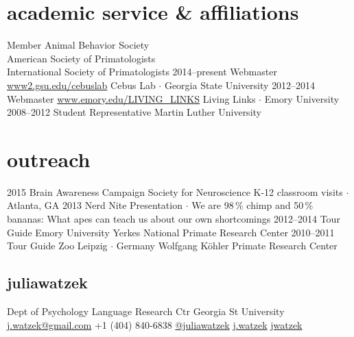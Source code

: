 \documentclass[]{friggeri-cv}
\begin{document}
\section{academic service \& affiliations}

\begin{entrylist}
  \entry
    {}
    {Member}
    {}
    {Animal Behavior Society\\
    American Society of Primatologists\\
    International Society of Primatologists}
  \entry
    {2014--present}
    {Webmaster}
    {\href{http://www2.gsu.edu/cebuslab}{www2.gsu.edu/cebuslab}}
    {Cebus Lab $\cdot$ Georgia State University}
  \entry
    {2012--2014}
    {Webmaster}
    {\href{http://www.emory.edu/LIVING_LINKS}{www.emory.edu/LIVING\_LINKS}}
    {Living Links $\cdot$ Emory University}
  \entry
    {2008--2012}
    {Student Representative}
    {}
    {Martin Luther University}
\end{entrylist}

\section{outreach}

\begin{entrylist}
  \entry
    {2015}
    {Brain Awareness Campaign}
    {Society for Neuroscience}
    {K-12 classroom visits $\cdot$ Atlanta, GA}
  \entry
    {2013}
    {Nerd Nite}
    {}
    {Presentation $\cdot$ We are 98\,\% chimp and 50\,\% bananas: What apes can teach us about our own shortcomings}
  \entry
    {2012--2014}
    {Tour Guide}
    {Emory University}
    {Yerkes National Primate Research Center}
  \entry
    {2010--2011}
    {Tour Guide}
    {Zoo Leipzig $\cdot$ Germany}
    {Wolfgang K\"{o}hler Primate Research Center}
\end{entrylist}

\begin{aside}
  \section{{\normalfont julia}watzek}
    Dept of Psychology
    Language Research Ctr
    Georgia St University
    ~
    \href{mailto:j.watzek@gmail.com}{j.watzek@gmail.com}
    +1 (404) 840-6838
    \faTw{} \href{http://www.twitter.com/juliawatzek}{@juliawatzek}
    \faSkype{} \href{Skype:j.watzek?call}{j.watzek}
    \faGit{} \href{https?//github.com/jwatzek}{jwatzek}
\end{aside}
\end{document}
